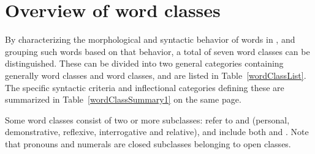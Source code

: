 \section{Overview of word classes}\label{introWordForms}
By characterizing the morphological and syntactic behavior of words in \PS, and grouping such words based on that behavior, a total of seven word classes can be distinguished. These can be divided into two general categories containing generally  word classes and  word classes, and are listed in Table~\vref{wordClassList}. 
The specific syntactic criteria and inflectional categories defining these are summarized in Table~\ref{wordClassSummary1} on the same page. %

Some word classes consist of two or more subclasses: 
 refer to  %
and  (personal, demonstrative, reflexive, interrogative and relative), and  include both  and . %
Note that pronouns and numerals are closed subclasses belonging to open classes.

